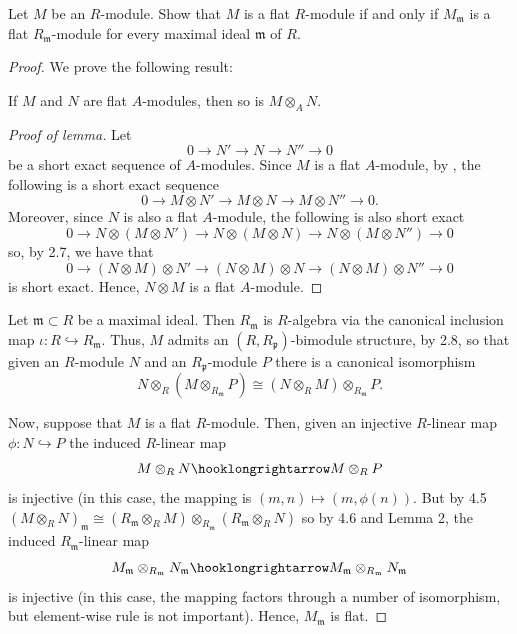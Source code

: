 \newpage
\begin{problem}
Let $M$ be an $R$-module. Show that $M$ is a flat $R$-module if
and only if $M_{\mathfrak{m}}$ is a flat
$R_{\mathfrak{m}}$-module for every maximal ideal $\mathfrak{m}$
of $R$.
\end{problem}
\begin{proof}
We prove the following result:
\begin{lemma}
If $M$ and $N$ are flat $A$-modules, then so is $M\otimes_A N$.
\end{lemma}
\begin{proof}[Proof of lemma]
\renewcommand\qedsymbol{$\clubsuit$}
Let
\[
0\longrightarrow
N'\longrightarrow
N\longrightarrow
N''\longrightarrow
0
\]
be a short exact sequence of $A$-modules. Since $M$ is a flat
$A$-module, by , the following is a short exact sequence
\[
0\longrightarrow
M\otimes N'\longrightarrow
M\otimes N\longrightarrow
M\otimes N''\longrightarrow
0.
\]
Moreover, since $N$ is also a flat $A$-module, the following is also short
exact
\[
0\longrightarrow
N\otimes(M\otimes N')\longrightarrow
N\otimes(M\otimes N)\longrightarrow
N\otimes(M\otimes N'')\longrightarrow
0
\]
so, by 2.7, we have that
\[
0\longrightarrow
(N\otimes M)\otimes N'\longrightarrow
(N\otimes M)\otimes N\longrightarrow
(N\otimes M)\otimes N''\longrightarrow
0
\]
is short exact. Hence, $N\otimes M$ is a flat $A$-module.
\end{proof}
Let $\mathfrak{m}\subset R$ be a maximal ideal. Then
$R_{\mathfrak{m}}$ is $R$-algebra via the canonical inclusion map
$\iota\colon R\hookrightarrow R_{\mathfrak{m}}$. Thus, $M$ admits
an $(R,R_{\mathfrak{p}})$-bimodule structure, by 2.8, so that given
an $R$-module $N$ and an $R_{\mathfrak{p}}$-module $P$ there is a
canonical isomorphism
\[
N\otimes_R (M\otimes_{R_{\mathfrak{m}}} P)\cong (N\otimes _R
M)\otimes_{R_{\mathfrak{m}}} P.
\]

Now, suppose that $M$ is a flat $R$-module. Then, given an
injective $R$-linear map $\phi\colon N\hookrightarrow P$ the
induced $R$-linear map
\[
M\otimes_R N
\hooklongrightarrow
M\otimes_R P
\]
is injective (in this case, the mapping is
$(m,n)\mapsto(m,\phi(n))$. But by 4.5 $(M\otimes_R
N)_{\mathfrak{m}}\cong (R_{\mathfrak{m}}\otimes_R
M)\otimes_{R_{\mathfrak{m}}}(R_{\mathfrak{m}}\otimes_R N)$ so by
4.6 and Lemma 2, the induced $R_{\mathfrak{m}}$-linear map
\[
M_{\mathfrak{m}}\otimes_{R_{\mathfrak{m}}} N_{\mathfrak{m}}\hooklongrightarrow
M_{\mathfrak{m}}\otimes_{R_{\mathfrak{m}}} N_{\mathfrak{m}}
\]
is injective (in this case, the mapping factors through a number
of isomorphism, but element-wise rule is not important). Hence,
$M_{\mathfrak{m}}$ is flat.


\end{proof}

